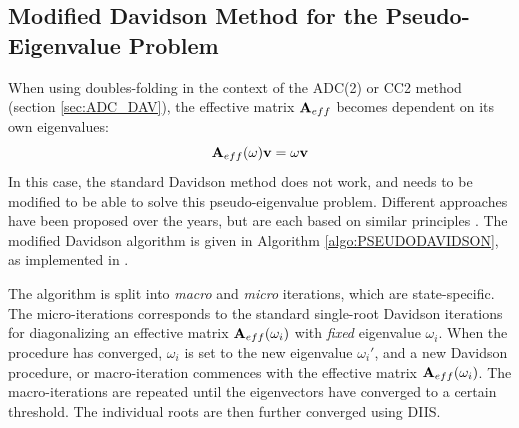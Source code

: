 \subsection{Modified Davidson Method for the Pseudo-Eigenvalue Problem}

When using doubles-folding in the context of the ADC(2) or CC2 method (section \ref{sec:ADC_DAV}), the effective matrix $\mathbf{A}_{eff}$ becomes dependent on its own eigenvalues:
\begin{equation}
\mathbf{A}_{eff}(\omega) \mathbf{v} = \omega \mathbf{v}
\end{equation}
\noindent In this case, the standard Davidson method does not work, and needs to be modified to be able to solve this pseudo-eigenvalue problem. Different approaches have been proposed over the years, but are each based on similar principles \cite{Kat2009,Win2011}. The modified Davidson algorithm is given in Algorithm \ref{algo:PSEUDODAVIDSON}, as implemented in \mchem{}. 

The algorithm is split into \emph{macro} and \emph{micro} iterations, which are state-specific. The micro-iterations corresponds to the standard single-root Davidson iterations for diagonalizing an effective matrix $\mathbf{A}_{eff}(\omega_i)$ with \emph{fixed} eigenvalue $\omega_i$. When the procedure has converged, $\omega_i$ is set to the new eigenvalue $\omega_i'$, and a new Davidson procedure, or macro-iteration commences with the effective matrix $\mathbf{A}_{eff}(\omega_i)$. The macro-iterations are repeated until the eigenvectors have converged to a certain threshold. The individual roots are then further converged using DIIS.

